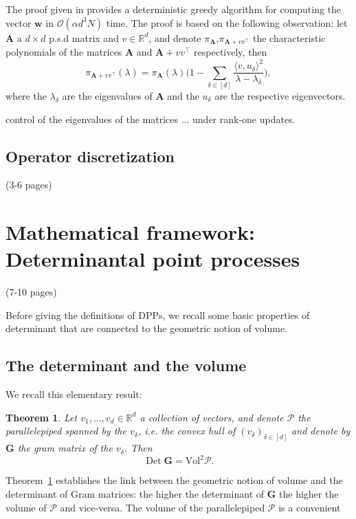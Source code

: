 \documentclass[twoside,11pt]{book}
\newtheorem{theorem}{Theorem}
\numberwithin{theorem}{chapter}
\numberwithin{definition}{chapter}
\numberwithin{proposition}{chapter}
\numberwithin{corollary}{chapter}
\numberwithin{example}{chapter}
\numberwithin{lemma}{chapter}
\numberwithin{assumption}{chapter}
\DeclareMathOperator{\Det}{Det}
\DeclareMathOperator{\Tran}{\intercal}
\begin{document}
The proof given in \citep{BaSpSr12} provides a deterministic greedy algorithm for computing the vector $\bm{w}$ in $\mathcal{O}(\alpha d^{3} N)$ time. The proof is based on the following observation: let $\bm{A}$ a $d\times d$ p.s.d matrix and $v \in \mathbb{R}^{d}$, and denote $\pi_{\bm{A}}$,$\pi_{\bm{A}+vv^{\Tran}}$ the characteristic polynomials of the matrices $\bm{A}$ and $\bm{A}+vv^{\Tran}$ respectively, then 
\begin{equation}
\pi_{\bm{A}+vv^{\Tran}}(\lambda) =  \pi_{\bm{A}}(\lambda) \bigg( 1- \sum\limits_{\delta \in [d]} \frac{\langle v,u_{\delta} \rangle^{2}}{\lambda-\lambda_{\delta}} \bigg), 
\end{equation}
where the $\lambda_{\delta}$ are the eigenvalues of $\bm{A}$ and the $u_{\delta}$ are the respective eigenvectors.



control of the eigenvalues of the matrices ... under rank-one updates.


\subsection{Operator discretization}
(3-6 pages)
\section{Mathematical framework: Determinantal point processes}
(7-10 pages)
 

Before giving the definitions of DPPs, we recall some basic properties of determinant that are connected to the geometric notion of volume.

\subsection{The determinant and the volume}
We recall this elementary result:
\begin{theorem}\label{thm:link_det_vol}
Let $v_{1}, \dots, v_{d} \in \mathbb{R}^{d}$ a collection of vectors, and denote $\mathcal{P}$ the parallelepiped spanned by the $v_{\delta}$, i.e. the convex hull of $(v_{\delta})_{\delta \in [d]}$ and denote by $\bm{G}$ the gram matrix of the $v_{\delta}$. Then
\begin{equation}
\Det \bm{G} = \mathrm{Vol}^{2} \mathcal{P}. \nonumber
\end{equation}
\end{theorem}
Theorem~\ref{thm:link_det_vol} establishes the link between the geometric notion of volume and the determinant of Gram matrices: the higher the determinant of $\bm{G}$ the higher the volume of $\mathcal{P}$ and vice-versa. The volume of the parallelepiped $\mathcal{P}$ is a convenient 
\end{document}
